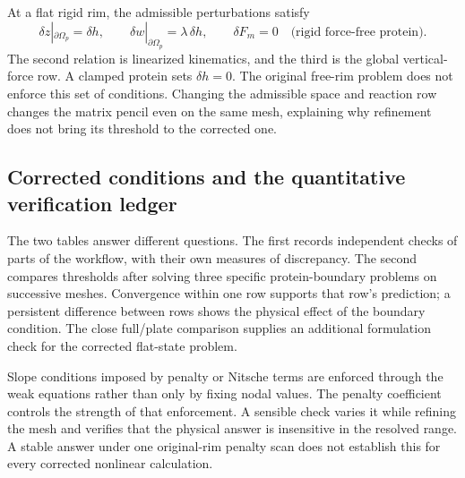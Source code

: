At a flat rigid rim, the admissible perturbations satisfy
\begin{equation}
\delta z|_{\partial\Omega_p}=\delta h,\qquad
\delta w|_{\partial\Omega_p}=\lambda\,\delta h,
\qquad \delta F_m=0
\quad\text{(rigid force-free protein)}.
\label{eq:rigid-linear-rim}
\end{equation}
The second relation is linearized kinematics, and the third is the global vertical-force row. A clamped protein sets $\delta h=0$. The original free-rim problem does not enforce this set of conditions. Changing the admissible space and reaction row changes the matrix pencil even on the same mesh, explaining why refinement does not bring its threshold to the corrected one.

\subsection{Corrected conditions and the quantitative verification ledger}


The two tables answer different questions. The first records independent checks of parts of the workflow, with their own measures of discrepancy. The second compares thresholds after solving three specific protein-boundary problems on successive meshes. Convergence within one row supports that row's prediction; a persistent difference between rows shows the physical effect of the boundary condition. The close full/plate comparison supplies an additional formulation check for the corrected flat-state problem.

Slope conditions imposed by penalty or Nitsche terms are enforced through the weak equations rather than only by fixing nodal values. The penalty coefficient controls the strength of that enforcement. A sensible check varies it while refining the mesh and verifies that the physical answer is insensitive in the resolved range. A stable answer under one original-rim penalty scan does not establish this for every corrected nonlinear calculation.


